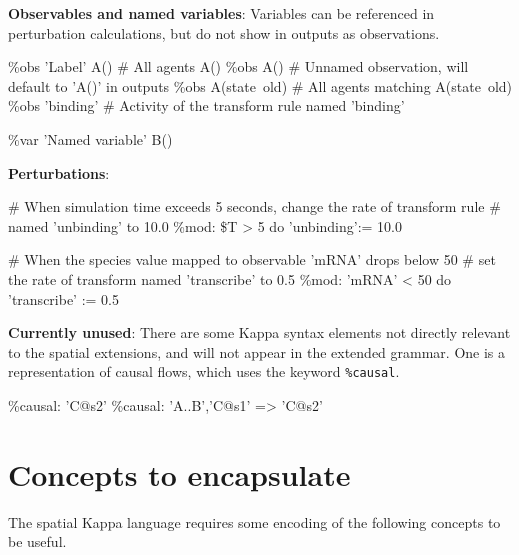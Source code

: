 \textbf{Observables and named variables}: Variables can be referenced in perturbation calculations, but do not show in outputs as observations.

\begin{kappasource}
\%obs 'Label' A()  # All agents A()
\%obs A()          # Unnamed observation, will default to 'A()' in outputs
\%obs A(state~old) # All agents matching A(state~old)
\%obs 'binding'    # Activity of the transform rule named 'binding'

\%var 'Named variable' B()
\end{kappasource} 

\textbf{Perturbations}: 

\begin{kappasource}
# When simulation time exceeds 5 seconds, change the rate of transform rule
#   named 'unbinding' to 10.0
\%mod: \$T > 5 do ’unbinding’:= 10.0

# When the species value mapped to observable 'mRNA' drops below 50
#   set the rate of transform named 'transcribe' to 0.5
\%mod: 'mRNA' < 50 do 'transcribe' := 0.5
\end{kappasource} 

\textbf{Currently unused}: There are some Kappa syntax elements not directly relevant to the spatial extensions, and will not appear in the extended grammar. One is a representation of causal flows, which uses the keyword \verb|%causal|.

\begin{kappasource}
\%causal: ’C@s2’ 
\%causal: {’A..B’,’C@s1’} => ’C@s2’ 
\end{kappasource} 


\section{Concepts to encapsulate}

The spatial Kappa language requires some encoding of the following concepts to be useful.

